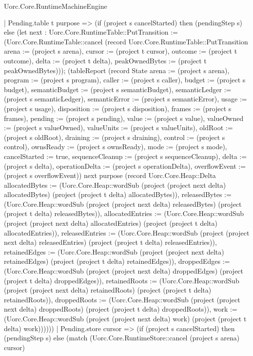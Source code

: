 \begin{lexlean}{Uorc.Core.RuntimeMachineEngine}
\begin{semanticmodule}
{    | Pending.table t purpose => (if (project s cancelStarted) then (pendingStep s) else (let next : Uorc.Core.RuntimeTable::PutTransition := (Uorc.Core.RuntimeTable::cancel (record Uorc.Core.RuntimeTable::PutTransition {arena := (project s arena), cursor := (project t cursor), outcome := (project t outcome), delta := (project t delta), peakOwnedBytes := (project t peakOwnedBytes)})); (tableReport (record State {arena := (project s arena), program := (project s program), caller := (project s caller), budget := (project s budget), semanticBudget := (project s semanticBudget), semanticLedger := (project s semanticLedger), semanticError := (project s semanticError), usage := (project s usage), disposition := (project s disposition), frames := (project s frames), pending := (project s pending), value := (project s value), valueOwned := (project s valueOwned), valueUnits := (project s valueUnits), oldRoot := (project s oldRoot), draining := (project s draining), control := (project s control), ownsReady := (project s ownsReady), mode := (project s mode), cancelStarted := true, sequenceCleanup := (project s sequenceCleanup), delta := (project s delta), operationDelta := (project s operationDelta), overflowEvent := (project s overflowEvent)}) next purpose (record Uorc.Core.Heap::Delta {allocatedBytes := (Uorc.Core.Heap::wordSub (project (project next delta) allocatedBytes) (project (project t delta) allocatedBytes)), releasedBytes := (Uorc.Core.Heap::wordSub (project (project next delta) releasedBytes) (project (project t delta) releasedBytes)), allocatedEntries := (Uorc.Core.Heap::wordSub (project (project next delta) allocatedEntries) (project (project t delta) allocatedEntries)), releasedEntries := (Uorc.Core.Heap::wordSub (project (project next delta) releasedEntries) (project (project t delta) releasedEntries)), retainedEdges := (Uorc.Core.Heap::wordSub (project (project next delta) retainedEdges) (project (project t delta) retainedEdges)), droppedEdges := (Uorc.Core.Heap::wordSub (project (project next delta) droppedEdges) (project (project t delta) droppedEdges)), retainedRoots := (Uorc.Core.Heap::wordSub (project (project next delta) retainedRoots) (project (project t delta) retainedRoots)), droppedRoots := (Uorc.Core.Heap::wordSub (project (project next delta) droppedRoots) (project (project t delta) droppedRoots)), work := (Uorc.Core.Heap::wordSub (project (project next delta) work) (project (project t delta) work))}))))
    | Pending.store cursor => (if (project s cancelStarted) then (pendingStep s) else (match (Uorc.Core.RuntimeStore::cancel (project s arena) cursor)
}
\end{semanticmodule}
\end{lexlean}
